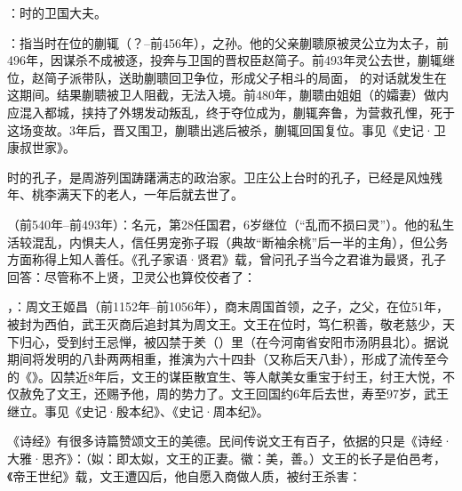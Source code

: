 ：时的卫国大夫。

：指当时在位的蒯辄（？--前456年），之孙。他的父亲蒯聩原被灵公立为太子，前496年，因谋杀不成被逐，投奔与卫国的晋权臣赵简子。前493年灵公去世，蒯辄继位，赵简子派带队，送助蒯聩回卫争位，形成父子相斗的局面， 的对话就发生在这期间。结果蒯聩被卫人阻截，无法入境。前480年，蒯聩由姐姐（的孀妻）做内应混入都城，挟持了外甥发动叛乱，终于夺位成为，蒯辄奔鲁，为营救孔悝，死于这场变故。3年后，晋又围卫，蒯聩出逃后被杀，蒯辄回国复位。事见《史记·卫康叔世家》。%

时的孔子，是周游列国踌躇满志的政治家。卫庄公上台时的孔子，已经是风烛残年、桃李满天下的老人，一年后就去世了。

（前540年--前493年）：名元，第28任国君，6岁继位（“乱而不损曰灵”）。他的私生活较混乱，内惧夫人，信任男宠弥子瑕（典故“断袖余桃”后一半的主角），但公务方面称得上知人善任。《孔子家语·贤君》载，曾问孔子当今之君谁为最贤，孔子回答：尽管称不上贤，卫灵公也算佼佼者了：

，：周文王姬昌（前1152年--前1056年），商末周国首领，之子，之父，在位51年，被封为西伯，武王灭商后追封其为周文王。文王在位时，笃仁积善，敬老慈少，天下归心，受到纣王忌惮，被囚禁于羑（）里（在今河南省安阳市汤阴县北）。据说期间将发明的八卦两两相重，推演为六十四卦（又称后天八卦），形成了流传至今的《》。囚禁近8年后，文王的谋臣散宜生、等人献美女重宝于纣王，纣王大悦，不仅赦免了文王，还赐予他，周的势力了。文王回国约6年后去世，寿至97岁，武王继立。事见《史记·殷本纪》、《史记·周本纪》。%

《诗经》有很多诗篇赞颂文王的美德。民间传说文王有百子，依据的只是《诗经·大雅·思齐》：（姒：即太姒，文王的正妻。徽：美，善。）文王的长子是伯邑考，《帝王世纪》载，文王遭囚后，他自愿入商做人质，被纣王杀害： %

